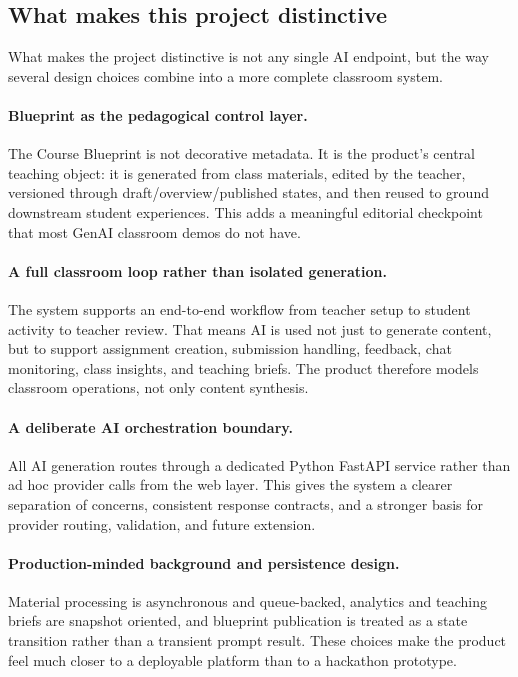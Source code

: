 \documentclass[11pt,a4paper]{article}
\begin{document}
\subsection{What makes this project distinctive}

What makes the project distinctive is not any single AI endpoint, but the way several design choices
combine into a more complete classroom system.

\paragraph*{Blueprint as the pedagogical control layer.}
The Course Blueprint is not decorative metadata. It is the product's central teaching object: it is
generated from class materials, edited by the teacher, versioned through draft/overview/published
states, and then reused to ground downstream student experiences. This adds a meaningful editorial
checkpoint that most GenAI classroom demos do not have.

\paragraph*{A full classroom loop rather than isolated generation.}
The system supports an end-to-end workflow from teacher setup to student activity to teacher review.
That means AI is used not just to generate content, but to support assignment creation, submission
handling, feedback, chat monitoring, class insights, and teaching briefs. The product therefore
models classroom operations, not only content synthesis.

\paragraph*{A deliberate AI orchestration boundary.}
All AI generation routes through a dedicated Python FastAPI service rather than ad hoc provider calls
from the web layer. This gives the system a clearer separation of concerns, consistent response
contracts, and a stronger basis for provider routing, validation, and future extension.

\paragraph*{Production-minded background and persistence design.}
Material processing is asynchronous and queue-backed, analytics and teaching briefs are snapshot
oriented, and blueprint publication is treated as a state transition rather than a transient prompt
result. These choices make the product feel much closer to a deployable platform than to a hackathon
prototype.
\end{document}
